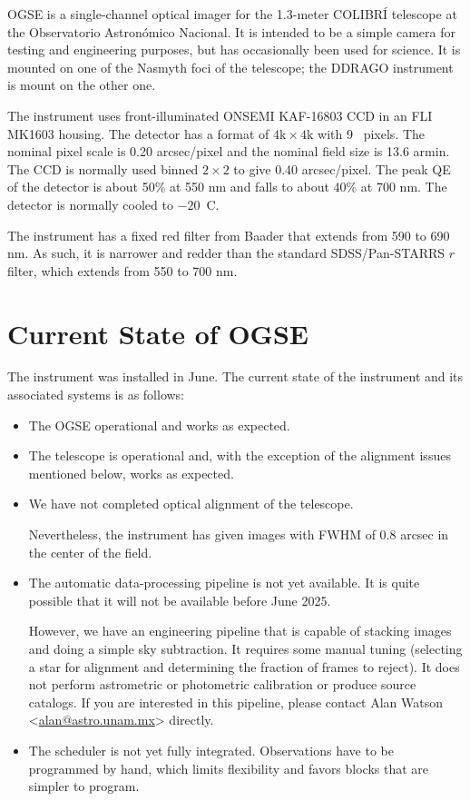 OGSE is a single-channel optical imager for the 1.3-meter COLIBRÍ telescope at the Observatorio Astronómico Nacional. It is intended to be a simple camera for testing and engineering purposes, but has occasionally been used for science. It is mounted on one of the Nasmyth foci of the telescope; the DDRAGO instrument is mount on the other one.

The instrument uses front-illuminated ONSEMI KAF-16803 CCD in an FLI MK1603 housing. The detector has a format of $4\mathrm{k}\times4\mathrm{k}$ with 9~{\micron} pixels. The nominal pixel scale is 0.20 \unit{arcsec/pixel} and the nominal field size is 13.6 \unit{armin}. The CCD is normally used binned $2\times2$ to give 0.40 \unit{arcsec/pixel}. The peak QE of the detector is about 50\% at 550 nm and falls to about 40\% at 700 nm. The detector is normally cooled to $-20$~\unit{C}.

The instrument has a fixed red filter from Baader that extends from 590 to 690 nm. As such, it is narrower and redder than the standard SDSS/Pan-STARRS $r$ filter, which extends from 550 to 700 nm. 

\section{Current State of OGSE}

The instrument was installed in June. The current state of the instrument and its associated systems is as follows:

\begin{itemize}

\item 
The OGSE operational and works as expected. 

\item 
The telescope is operational and, with the exception of the alignment issues mentioned below, works as expected. 

\item
We have not completed optical alignment of the telescope. 

Nevertheless, the instrument has given images with FWHM of 0.8 arcsec in the center of the field. 

\item
The automatic data-processing pipeline is not yet available. It is quite possible that it will not be available before June 2025. 

However, we have an engineering pipeline that is capable of stacking images and doing a simple sky subtraction. It requires some manual tuning (selecting a star for alignment and determining the fraction of frames to reject). It does not perform astrometric or photometric calibration or produce source catalogs. If you are interested in this pipeline, please contact Alan Watson <\href{mailto:alan@astro.unam.mx}{alan@astro.unam.mx}> directly.

\item
The scheduler is not yet fully integrated. Observations have to be programmed by hand, which limits flexibility and favors blocks that are simpler to program.

\end{itemize}
